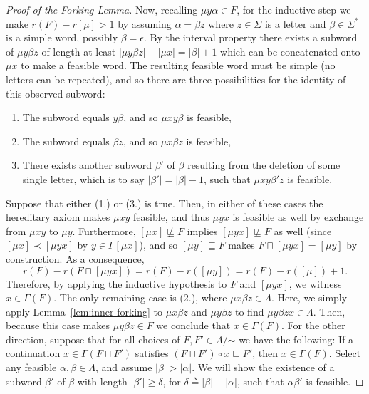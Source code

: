 \documentclass[11pt]{article}
\newcommand{\univ}{\Sigma}
\newcommand{\glang}{\Lambda}
\begin{document}
\begin{proof}[Proof of the Forking Lemma]
    Now, recalling $\mu y \alpha \in F$, for the inductive step we make $r(F) - r[\mu] > 1$ by assuming $\alpha = \beta z$ where $z \in \univ$ is a letter and $\beta \in \univ^*$ is a simple word, possibly $\beta = \epsilon$.
    By the interval property there exists a subword of $\mu y \beta z$ of length at least $|\mu y \beta z| - |\mu x| = |\beta| + 1$ which can be concatenated onto $\mu x$ to make a feasible word.
    The resulting feasible word must be simple (no letters can be repeated), and so there are three possibilities for the identity of this observed subword:
    \begin{enumerate}
        \item The subword equals $y\beta$, and so $\mu x y \beta$ is feasible,
        \item The subword equals $\beta z$, and so $\mu x \beta z$ is feasible,
        \item There exists another subword $\beta'$ of $\beta$ resulting from the deletion of some single letter, which is to say $|\beta'| = |\beta| -1$, such that $\mu x y \beta' z$ is feasible.
    \end{enumerate}
    Suppose that either (1.) or (3.) is true.
    Then, in either of these cases the hereditary axiom makes $\mu xy$ feasible, and thus $\mu y x$ is feasible as well by exchange from $\mu xy$ to $\mu y$.
    Furthermore, $[\mu x] \not\sqsubseteq F$ implies $[\mu y x] \not\sqsubseteq F$ as well (since $[\mu x] \prec [\mu y x]$ by $y \in \Gamma[\mu x]$), and so $[\mu y] \sqsubseteq F$ makes $F \sqcap [\mu yx] = [\mu y]$ by construction.
    As a consequence,
    \[
        r(F) - r(F \sqcap [\mu y x]) = r(F) - r([\mu y]) = r(F) - r([\mu]) + 1.
    \]
    Therefore, by applying the inductive hypothesis to $F$ and $[\mu y x]$, we witness $x \in \Gamma(F)$.
    The only remaining case is (2.), where $\mu x \beta z \in \glang$.
    Here, we simply apply Lemma~\ref{lem:inner-forking} to $\mu x \beta z$ and $\mu y \beta z$ to find $\mu y \beta z x \in \glang$.
    Then, because this case makes $\mu y \beta z \in F$ we conclude that $x \in \Gamma(F)$.
\iffalse
    For the other direction, suppose that for all choices of $F,F' \in \glang/\mathord{\sim}$ we have the following: If a continuation $x \in \Gamma(F\sqcap F')$ satisfies $(F\sqcap F')\circ x \sqsubseteq F'$, then $x \in \Gamma(F)$.
    Select any feasible $\alpha, \beta \in \glang$, and assume $|\beta| > |\alpha|$.
    We will show the existence of a subword $\beta'$ of $\beta$ with length $|\beta'| \geq \delta$, for $\delta \triangleq |\beta| - |\alpha|$, such that $\alpha\beta'$ is feasible.

\end{proof}
\end{document}
